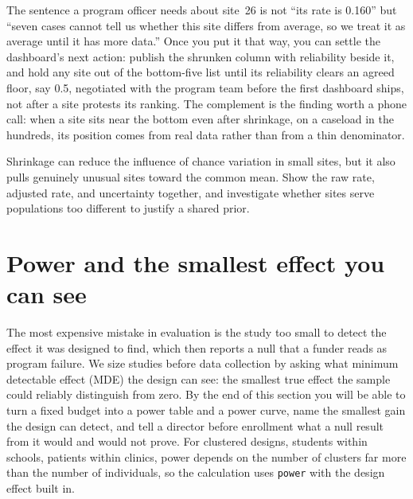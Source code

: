 The sentence a program officer needs about site~26 is not \enquote{its rate is 0.160} but \enquote{seven cases cannot tell us whether this site differs from average, so we treat it as average until it has more data.} Once you put it that way, you can settle the dashboard's next action: publish the shrunken column with reliability beside it, and hold any site out of the bottom-five list until its reliability clears an agreed floor, say 0.5, negotiated with the program team before the first dashboard ships, not after a site protests its ranking. The complement is the finding worth a phone call: when a site sits near the bottom even after shrinkage, on a caseload in the hundreds, its position comes from real data rather than from a thin denominator.

Shrinkage can reduce the influence of chance variation in small sites, but it also pulls genuinely unusual sites toward the common mean. Show the raw rate, adjusted rate, and uncertainty together, and investigate whether sites serve populations too different to justify a shared prior.

\section{Power and the smallest effect you can see}\label{sec:mde}
The most expensive mistake in evaluation is the study too small to detect the effect it was designed to find, which then reports a null that a funder reads as program failure. We size studies before data collection by asking what minimum detectable effect (MDE) the design can see: the smallest true effect the sample could reliably distinguish from zero. By the end of this section you will be able to turn a fixed budget into a power table and a power curve, name the smallest gain the design can detect, and tell a director before enrollment what a null result from it would and would not prove. For clustered designs, students within schools, patients within clinics, power depends on the number of clusters far more than the number of individuals, so the calculation uses \texttt{power} with the design effect built in.

